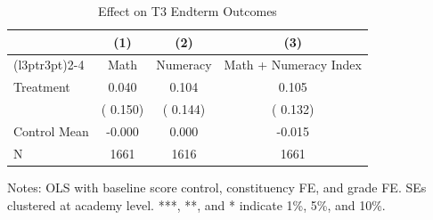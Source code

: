 \begin{table}[!htbp]
\centering
\caption{Effect on T3 Endterm Outcomes}
\label{tab:ng_t3_ete}
\begin{threeparttable}
\begin{tabular}[t]{lccc}
\toprule
 & (1) & (2) & (3) \\
\cmidrule(l{3pt}r{3pt}){2-4}
 & Math & Numeracy & Math + Numeracy Index \\
\midrule
Treatment &   0.040 &   0.104 &   0.105 \\
 & (  0.150) & (  0.144) & (  0.132) \\
\addlinespace
Control Mean &  -0.000 &   0.000 &  -0.015 \\
N & 1661 & 1616 & 1661 \\
\bottomrule
\end{tabular}
\begin{tablenotes}[para]
\item Notes: OLS with baseline score control, constituency FE, and grade FE. 
SEs clustered at academy level. ***, **, and * indicate 1\%, 5\%, and 10\%.
\end{tablenotes}
\end{threeparttable}
\end{table}

